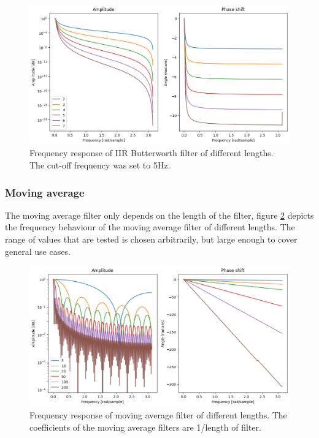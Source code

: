 \begin{figure}[h!t]
	\begin{center}
		\includegraphics[width=1.0\columnwidth]{images/iir_frequencyresponse_coefficients.png}
	\end{center}
	\caption{Frequency response of IIR Butterworth filter of different lengths. The cut-off frequency was set to 5Hz.}
	\label{fig:iir_frequencyresponse_coefficients}
\end{figure}

\subsubsection{Moving average}
The moving average filter only depends on the length of the filter, figure \ref{fig:movingaverage_frequencyresponse_coefficients} depicts the frequency behaviour of the moving average filter of different lengths. The range of values that are tested is chosen arbitrarily, but large enough to cover general use cases.

\begin{figure}[h!t]
	\begin{center}
		\includegraphics[width=1.0\columnwidth]{images/movingaverage_frequencyresponse_coefficients.png}
	\end{center}
	\caption{Frequency response of moving average filter of different lengths. The coefficients of the moving average filters are 1/length of filter.}
	\label{fig:movingaverage_frequencyresponse_coefficients}
\end{figure}

